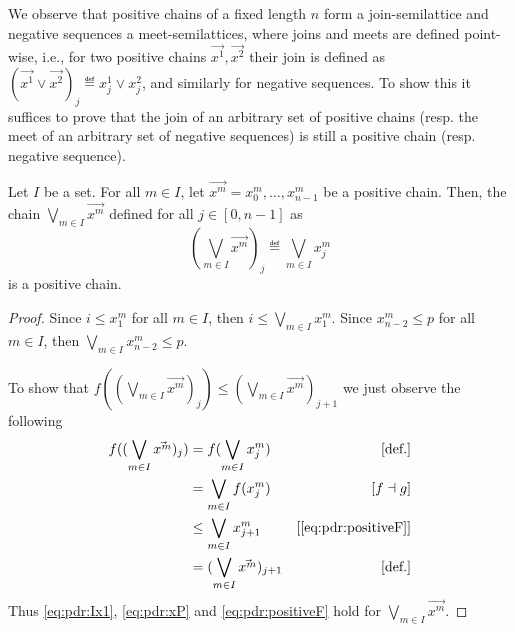 We observe that positive chains of a fixed length $n$ form a join-semilattice and negative sequences a meet-semilattices, where joins and meets are defined point-wise, i.e., for two positive chains $\vec{x^1}, \vec{x^2}$ their join is defined as $(\vec{x^1} \lor \vec{x^2})_j \eqdef x^1_j\lor x^2_j$, and similarly for negative sequences. To show this it suffices to prove that the join of an arbitrary set of positive chains (resp. the meet of an arbitrary set of negative sequences) is still a positive chain (resp. negative sequence).

\begin{lemma}\label{lmm:pdr:joinpositive}
	Let $I$ be a set. For all $m \in I$, let $\vec{x^m}=x^m_0, \dots, x^m_{n-1}$ be a positive chain.
	Then, the chain $\bigvee_{m\in I} \vec{x^m}$ defined for all $j \in [0, n-1]$ as
	\[
	(\bigvee_{m\in I} \vec{x^m})_j \eqdef \bigvee_{m\in I}x^m_{j}
	\]
	is a positive chain.
\end{lemma}
\begin{proof}
	Since $ i \le x^m_{1}$ for all $m\in I$, then $ i \le \bigvee_{m\in I}x^m_{1} $.
	Since $ x^m_{n-2} \le p$ for all $m\in I$, then $ \bigvee_{m\in I}x^m_{n-2} \le p$.

	To show that $f( (\bigvee_{m\in I}\vec{x^m})_{j}) \le (\bigvee_{m\in I}\vec{x^m})_{j+1}$ we just observe the following
	\begin{align*}
		f((\bigvee_{m\in I}\vec{x^m})_{j}) & = f(\bigvee_{m\in I}x^m_j)          & [\text{def.}]              \\
		                                   & = \bigvee_{m\in I} f(x^m_{j} )      & [f \dashv g]               \\
		                                   & \le \bigvee_{m\in I} x^m_{j+1}      & [\eqref{eq:pdr:positiveF}] \\
		                                   & = (\bigvee_{m\in I}\vec{x^m})_{j+1} & [\text{def.}]
	\end{align*}
	Thus \eqref{eq:pdr:Ix1}, \eqref{eq:pdr:xP} and \eqref{eq:pdr:positiveF} hold for $\bigvee_{m\in I} \vec{x^m}$.
\end{proof}

